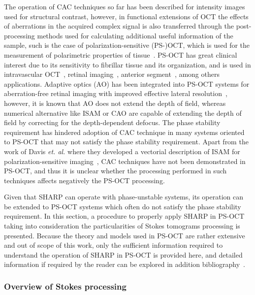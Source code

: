 The operation of CAC techniques so far has been described for intensity images used for structural contrast, however, in functional extensions of OCT the effects of aberrations in the acquired complex signal is also transferred through the post-processing methods used for calculating additional useful information of the sample, such is the case of polarization-sensitive (PS-)OCT, which is used for the measurement of polarimetric properties of tissue~\cite{deBoer1997_Twodimensional, deBoer2017_Polarization}. PS-OCT has great clinical interest due to its sensitivity to fibrillar tissue and its organization, and is used in intravascular OCT~\cite{Villiger2018_Coronary}, retinal imaging~\cite{Elmaanaoui2011_Birefringence, Cense2009_Retinal}, anterior segment~\cite{Li2020_Vectorial}, among others applications. Adaptive optics (AO) has been integrated into PS-OCT systems for aberration-free retinal imaging with improved effective lateral resolution~\cite{Cense2009_Retinal}, however, it is known that AO does not extend the depth of field, whereas numerical alternative like ISAM or CAO are capable of extending the depth of field by correcting for the depth-dependent defocus. The phase stability requirement has hindered adoption of CAC technique in many systems oriented to PS-OCT that may not satisfy the phase stability requirement. Apart from the work of Davis \textit{et. al.} where they developed a vectorial description of ISAM for polarization-sensitive imaging~\cite{Davis2007_Nonparaxial, Davis2007_Polarimetric}, CAC techniques have not been demonstrated in PS-OCT, and thus it is unclear whether the processing performed in such techniques affects negatively the PS-OCT processing.

Given that SHARP can operate with phase-unstable systems, its operation can be extended to PS-OCT systems which often do not satisfy the phase stability requirement. In this section, a procedure to properly apply SHARP in PS-OCT taking into consideration the particularities of Stokes tomograms processing is presented. Because the theory and models used in PS-OCT are rather extensive and out of scope of this work, only the sufficient information required to understand the operation of SHARP in PS-OCT is provided here, and detailed information if required by the reader can be explored in addition bibliography~\cite{deBoer2017_Polarization, Villiger2013_Spectral}.

\subsubsection{Overview of Stokes processing}

